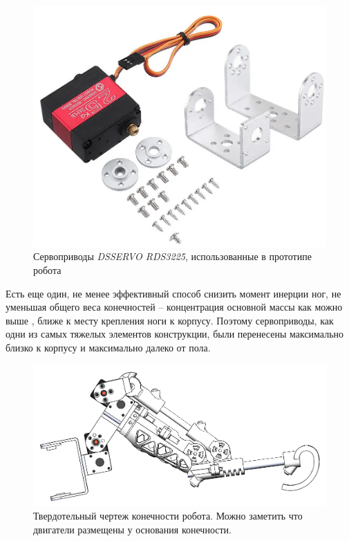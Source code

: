 \begin{figure}[h]
    \centering
    \includegraphics[scale=0.45]{chapter_mechanics_construction/figure6.png}
    \caption{Сервоприводы \textit{DSSERVO RDS3225}, использованные в прототипе робота}
    \label{}
\end{figure}

Есть еще один, не менее эффективный способ снизить момент инерции ног, не уменьшая общего веса конечностей -- концентрация основной массы как можно выше \cite{Seok2012}, ближе к месту крепления ноги к корпусу. Поэтому сервоприводы, как одни из самых тяжелых элементов конструкции, были перенесены максимально близко к корпусу и максимально далеко от пола.

\begin{figure}[h]
    \centering
    \includegraphics[scale=0.7]{chapter_mechanics_construction/figure7.png}
    \caption{Твердотельный чертеж конечности робота. Можно заметить что двигатели размещены у основания конечности.}
    \label{}
\end{figure}

